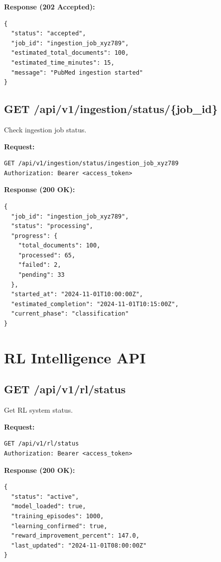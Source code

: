 \textbf{Response (202 Accepted):}
\begin{lstlisting}[style=pythonstyle]
{
  "status": "accepted",
  "job_id": "ingestion_job_xyz789",
  "estimated_total_documents": 100,
  "estimated_time_minutes": 15,
  "message": "PubMed ingestion started"
}
\end{lstlisting}

\subsection{GET /api/v1/ingestion/status/\{job\_id\}}

Check ingestion job status.

\textbf{Request:}
\begin{lstlisting}[style=bashstyle]
GET /api/v1/ingestion/status/ingestion_job_xyz789
Authorization: Bearer <access_token>
\end{lstlisting}

\textbf{Response (200 OK):}
\begin{lstlisting}[style=pythonstyle]
{
  "job_id": "ingestion_job_xyz789",
  "status": "processing",
  "progress": {
    "total_documents": 100,
    "processed": 65,
    "failed": 2,
    "pending": 33
  },
  "started_at": "2024-11-01T10:00:00Z",
  "estimated_completion": "2024-11-01T10:15:00Z",
  "current_phase": "classification"
}
\end{lstlisting}

\section{RL Intelligence API}

\subsection{GET /api/v1/rl/status}

Get RL system status.

\textbf{Request:}
\begin{lstlisting}[style=bashstyle]
GET /api/v1/rl/status
Authorization: Bearer <access_token>
\end{lstlisting}

\textbf{Response (200 OK):}
\begin{lstlisting}[style=pythonstyle]
{
  "status": "active",
  "model_loaded": true,
  "training_episodes": 1000,
  "learning_confirmed": true,
  "reward_improvement_percent": 147.0,
  "last_updated": "2024-11-01T08:00:00Z"
}
\end{lstlisting}

